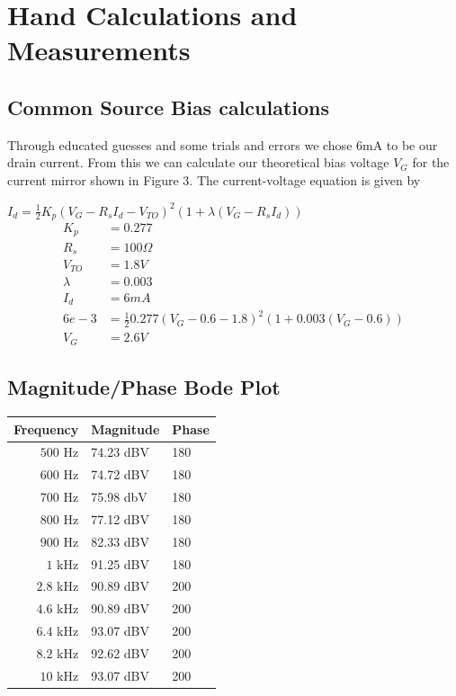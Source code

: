 \documentclass[11pt, twoside, letterpaper]{article}
\begin{document}
\section{Hand Calculations and Measurements}
\subsection{Common Source Bias calculations}
Through educated guesses and some trials and errors we chose 6mA to be our drain current. From this we can calculate our theoretical bias voltage
$V_G$ for the current mirror shown in Figure 3. The current-voltage equation is given by

$I_d = \frac{1}{2} K_p (V_G - R_s I_d -V_{TO})^2 (1 + \lambda (V_G - R_s I_d))$
\begin{align*}
K_p &= 0.277\\
R_s &= 100\Omega\\
V_{TO} &= 1.8V\\
\lambda &= 0.003\\
I_d &= 6mA\\
6e-3 &= \frac{1}{2}0.277(V_G-0.6-1.8)^2(1+0.003(V_G-0.6))\\
V_G &= 2.6V
\end{align*}

\subsection*{Magnitude/Phase Bode Plot}

\begin{tabular}{|r|l|l|}
\hline
Frequency & Magnitude & Phase\\
\hline
$500$ Hz & 74.23 dBV & 180 \\
$600$ Hz & 74.72 dBV & 180 \\
$700$ Hz & 75.98 dbV & 180 \\
$800$ Hz & 77.12 dBV & 180 \\
$900$ Hz & 82.33 dBV & 180 \\
$1$ kHz & 91.25 dBV & 180 \\
$2.8$ kHz & 90.89 dBV & 200 \\
$4.6$ kHz & 90.89 dBV & 200 \\
$6.4$ kHz& 93.07 dBV & 200 \\
$8.2$ kHz & 92.62 dBV & 200 \\
$10$  kHz& 93.07 dBV & 200 \\
\hline
\end{tabular}

\newpage
\end{document}
